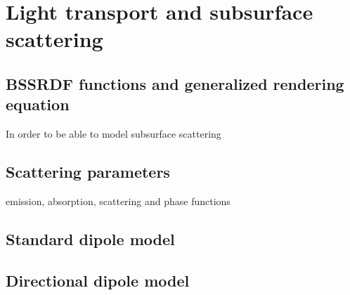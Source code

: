 \section{Light transport and subsurface scattering}
\subsection{BSSRDF functions and generalized rendering equation}

In order to be able to model subsurface scattering 

\subsection{Scattering parameters}
 emission, absorption, scattering and phase functions
\subsection{Standard dipole model}
\subsection{Directional dipole model}
